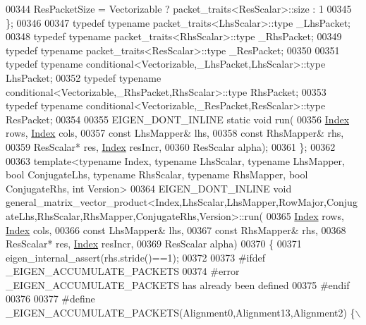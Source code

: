\begin{DoxyCode}
{00344   ResPacketSize = Vectorizable ? packet\_traits<ResScalar>::size : 1
00345 \};
00346 
00347 \textcolor{keyword}{typedef} \textcolor{keyword}{typename} packet\_traits<LhsScalar>::type  \_LhsPacket;
00348 \textcolor{keyword}{typedef} \textcolor{keyword}{typename} packet\_traits<RhsScalar>::type  \_RhsPacket;
00349 \textcolor{keyword}{typedef} \textcolor{keyword}{typename} packet\_traits<ResScalar>::type  \_ResPacket;
00350 
00351 \textcolor{keyword}{typedef} \textcolor{keyword}{typename} conditional<Vectorizable,\_LhsPacket,LhsScalar>::type LhsPacket;
00352 \textcolor{keyword}{typedef} \textcolor{keyword}{typename} conditional<Vectorizable,\_RhsPacket,RhsScalar>::type RhsPacket;
00353 \textcolor{keyword}{typedef} \textcolor{keyword}{typename} conditional<Vectorizable,\_ResPacket,ResScalar>::type ResPacket;
00354 
00355 EIGEN\_DONT\_INLINE \textcolor{keyword}{static} \textcolor{keywordtype}{void} run(
00356   \hyperlink{namespace_eigen_a62e77e0933482dafde8fe197d9a2cfde}{Index} rows, \hyperlink{namespace_eigen_a62e77e0933482dafde8fe197d9a2cfde}{Index} cols,
00357   \textcolor{keyword}{const} LhsMapper& lhs,
00358   \textcolor{keyword}{const} RhsMapper& rhs,
00359         ResScalar* res, \hyperlink{namespace_eigen_a62e77e0933482dafde8fe197d9a2cfde}{Index} resIncr,
00360   ResScalar alpha);
00361 \};
00362 
00363 \textcolor{keyword}{template}<\textcolor{keyword}{typename} Index, \textcolor{keyword}{typename} LhsScalar, \textcolor{keyword}{typename} LhsMapper, \textcolor{keywordtype}{bool} ConjugateLhs, \textcolor{keyword}{typename} RhsScalar, \textcolor{keyword}{
      typename} RhsMapper, \textcolor{keywordtype}{bool} ConjugateRhs, \textcolor{keywordtype}{int} Version>
00364 EIGEN\_DONT\_INLINE \textcolor{keywordtype}{void} 
      general\_matrix\_vector\_product<Index,LhsScalar,LhsMapper,RowMajor,ConjugateLhs,RhsScalar,RhsMapper,ConjugateRhs,Version>::run(
00365   \hyperlink{namespace_eigen_a62e77e0933482dafde8fe197d9a2cfde}{Index} rows, \hyperlink{namespace_eigen_a62e77e0933482dafde8fe197d9a2cfde}{Index} cols,
00366   \textcolor{keyword}{const} LhsMapper& lhs,
00367   \textcolor{keyword}{const} RhsMapper& rhs,
00368   ResScalar* res, \hyperlink{namespace_eigen_a62e77e0933482dafde8fe197d9a2cfde}{Index} resIncr,
00369   ResScalar alpha)
00370 \{
00371   eigen\_internal\_assert(rhs.stride()==1);
00372 
00373 \textcolor{preprocessor}{  #ifdef \_EIGEN\_ACCUMULATE\_PACKETS}
00374 \textcolor{preprocessor}{  #error \_EIGEN\_ACCUMULATE\_PACKETS has already been defined}
00375 \textcolor{preprocessor}{  #endif}
00376 
00377 \textcolor{preprocessor}{  #define \_EIGEN\_ACCUMULATE\_PACKETS(Alignment0,Alignment13,Alignment2) \{\(\backslash\)}
}
\end{DoxyCode}
